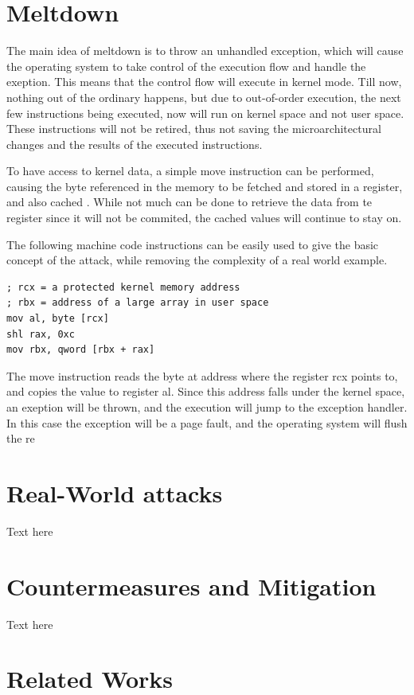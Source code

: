 \documentclass[sigconf]{acmart}
\begin{document}
\section{Meltdown}

The main idea of meltdown is to throw an unhandled exception, which will cause the operating system to take control of the execution flow and handle the exeption. This means that the control flow will execute in kernel mode. Till now, nothing out of the ordinary happens, but due to out-of-order execution, the next few instructions being executed, now will run on kernel space and not user space. These instructions will not be retired, thus not saving the microarchitectural changes and the results of the executed instructions.

To have access to kernel data, a simple move instruction can be performed, causing the byte referenced in the memory to be fetched and stored in a register, and also cached . While not much can be done to retrieve the data from te register since it will not be commited, the cached values will continue to stay on.

The following machine code instructions can be easily used to give the basic concept of the attack, while removing the complexity of a real world example. 
\begin{lstlisting}
; rcx = a protected kernel memory address
; rbx = address of a large array in user space
mov al, byte [rcx]         
shl rax, 0xc
mov rbx, qword [rbx + rax]
\end{lstlisting}

The move instruction reads the byte at address where the register rcx points to, and copies the value to register al. Since this address falls under the kernel space, an exeption will be thrown, and the execution will jump to the exception handler. In this case the exception will be a page fault, and the operating system will flush the re

\section{Real-World attacks}

Text here

\section{Countermeasures and Mitigation}

Text here 

\section{Related Works}
\end{document}
